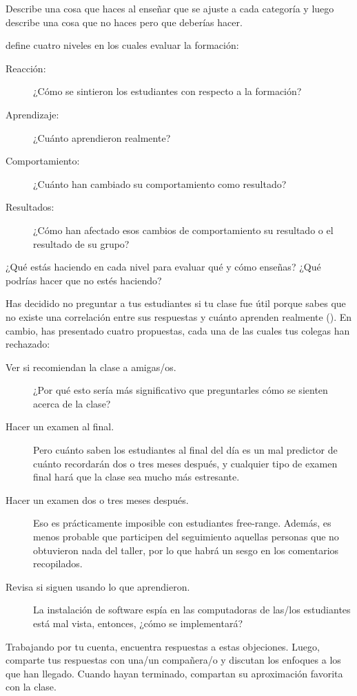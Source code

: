 Describe una cosa que haces al enseñar que se ajuste a cada categoría
y luego describe una cosa que no haces pero que deberías hacer.


\cite{Kirk1994} define cuatro niveles en los cuales evaluar la formación:

\begin{description}

\item[Reacción:]
  ¿Cómo se sintieron los estudiantes con respecto a la formación?

\item[Aprendizaje:]
  ¿Cuánto aprendieron realmente?

\item[Comportamiento:]
  ¿Cuánto han cambiado su comportamiento como resultado?

\item[Resultados:]
  ¿Cómo han afectado esos cambios de comportamiento su resultado
  o el resultado de su grupo?

\end{description}

¿Qué estás haciendo en cada nivel para evaluar qué y cómo enseñas?
¿Qué podrías hacer que no estés haciendo?


Has decidido no preguntar a tus estudiantes si tu clase fue útil
porque sabes que no existe una correlación entre sus respuestas
y cuánto aprenden realmente ().
En cambio,
has presentado cuatro propuestas,
cada una de las cuales tus colegas han rechazado:

\begin{description}

\item[Ver si recomiendan la clase a amigas/os.]
  ¿Por qué esto sería más significativo
  que preguntarles cómo se sienten acerca de la clase?
 
\item[Hacer un examen al final.]
  Pero cuánto saben los estudiantes al final del día
  es un mal predictor de cuánto recordarán dos o tres meses después,
  y cualquier tipo de examen final hará que la clase sea mucho más estresante.
 
\item[Hacer un examen dos o tres meses después.]
  Eso es prácticamente imposible con estudiantes free-range. 
  Además, es menos probable que participen del seguimiento
  aquellas personas que no obtuvieron nada del taller, 
  por lo que habrá un sesgo en los comentarios recopilados.
 
\item[Revisa si siguen usando lo que aprendieron.]
  La instalación de software espía en las computadoras de las/los estudiantes está mal vista,
  entonces, ¿cómo se implementará?

\end{description}

Trabajando por tu cuenta,
encuentra respuestas a estas objeciones.
Luego, comparte tus respuestas con una/un compañera/o
y discutan los enfoques a los que han llegado.
Cuando hayan terminado,
compartan su aproximación favorita con la clase.
